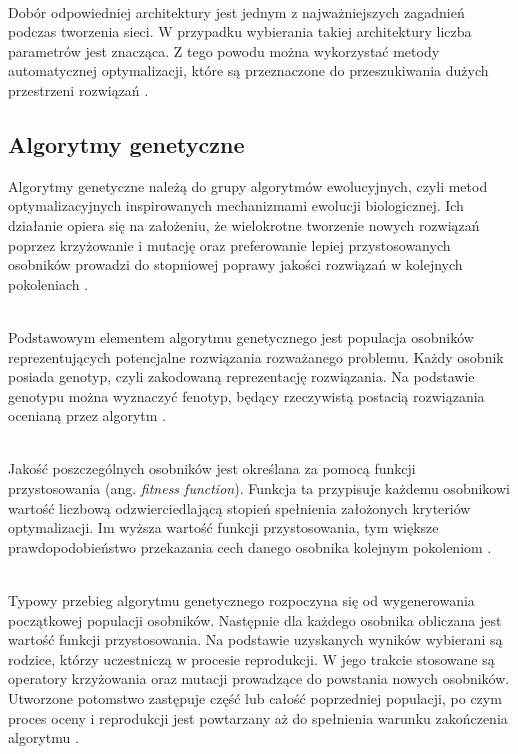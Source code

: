 \noindent\\
Dobór odpowiedniej architektury
jest jednym z najważniejszych zagadnień
podczas tworzenia sieci.
W przypadku wybierania takiej architektury 
liczba parametrów jest znacząca.
Z tego powodu można wykorzystać metody
automatycznej optymalizacji, które są przeznaczone
do przeszukiwania dużych przestrzeni rozwiązań%
%
.

\subsection{Algorytmy genetyczne}
Algorytmy genetyczne należą do grupy
algorytmów ewolucyjnych,
czyli metod optymalizacyjnych inspirowanych
mechanizmami ewolucji biologicznej.
Ich działanie opiera się na założeniu,
że wielokrotne tworzenie nowych rozwiązań
poprzez krzyżowanie i mutację
oraz preferowanie lepiej przystosowanych osobników
prowadzi do stopniowej poprawy jakości rozwiązań
w kolejnych pokoleniach%
%
.

\noindent\\
Podstawowym elementem algorytmu genetycznego
jest populacja osobników reprezentujących
potencjalne rozwiązania rozważanego problemu.
Każdy osobnik posiada genotyp,
czyli zakodowaną reprezentację rozwiązania.
Na podstawie genotypu można wyznaczyć fenotyp,
będący rzeczywistą postacią rozwiązania
ocenianą przez algorytm%
.

\noindent\\
Jakość poszczególnych osobników jest określana
za pomocą funkcji przystosowania
(ang. \textit{fitness function}).
Funkcja ta przypisuje każdemu osobnikowi wartość
liczbową odzwierciedlającą stopień spełnienia
założonych kryteriów optymalizacji.
Im wyższa wartość funkcji przystosowania,
tym większe prawdopodobieństwo przekazania cech
danego osobnika kolejnym pokoleniom%
.

\noindent\\
Typowy przebieg algorytmu genetycznego rozpoczyna się
od wygenerowania początkowej populacji osobników.
Następnie dla każdego osobnika obliczana
jest wartość funkcji przystosowania.
Na podstawie uzyskanych wyników wybierani są rodzice,
którzy uczestniczą w procesie reprodukcji.
W jego trakcie stosowane są operatory krzyżowania
oraz mutacji prowadzące do powstania nowych osobników.
Utworzone potomstwo zastępuje część
lub całość poprzedniej populacji,
po czym proces oceny i reprodukcji jest powtarzany
aż do spełnienia warunku zakończenia algorytmu%
.

